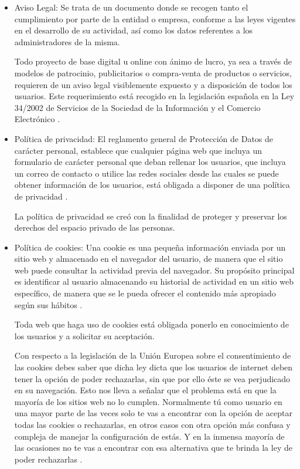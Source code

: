\documentclass[
  spanish,
  a4paper,
  openany]{book}
\begin{document}
\begin{itemize}
\item
  Aviso Legal: Se trata de un documento donde se recogen tanto el cumplimiento por parte de la entidad o empresa, conforme a las leyes vigentes en el desarrollo de su actividad, así como los datos referentes a los administradores de la misma.

  Todo proyecto de base digital u online con ánimo de lucro, ya sea a través de modelos de patrocinio, publicitarios o compra-venta de productos o servicios, requieren de un aviso legal visiblemente expuesto y a disposición de todos los usuarios. Este requerimiento está recogido en la legislación española en la Ley 34/2002 de Servicios de la Sociedad de la Información y el Comercio Electrónico \citep{IONOS-legal}.
\item
  Política de privacidad: El reglamento general de Protección de Datos de carácter personal, establece que cualquier página web que incluya un formulario de carácter personal que deban rellenar los usuarios, que incluya un correo de contacto o utilice las redes sociales desde las cuales se puede obtener información de los usuarios, está obligada a disponer de una política de privacidad \citep{IONOS-privacidad}.

  La política de privacidad se creó con la finalidad de proteger y preservar los derechos del espacio privado de las personas.
\item
  Política de cookies: Una cookie es una pequeña información enviada por un sitio web y almacenado en el navegador del usuario, de manera que el sitio web puede consultar la actividad previa del navegador. Su propósito principal es identificar al usuario almacenando su historial de actividad en un sitio web específico, de manera que se le pueda ofrecer el contenido más apropiado según sus hábitos \citep{IONOS-cookies}.

  Toda web que haga uso de cookies está obligada ponerlo en conocimiento de los usuarios y a solicitar su aceptación.

  Con respecto a la legislación de la Unión Europea sobre el consentimiento de las cookies debes saber que dicha ley dicta que los usuarios de internet deben tener la opción de poder rechazarlas, sin que por ello éste se vea perjudicado en su navegación. Esto nos lleva a señalar que el problema está en que la mayoría de los sitios web no lo cumplen. Normalmente tú como usuario en una mayor parte de las veces solo te vas a encontrar con la opción de aceptar todas las cookies o rechazarlas, en otros casos con otra opción más confusa y compleja de manejar la configuración de estás. Y en la inmensa mayoría de las ocasiones no te vas a encontrar con esa alternativa que te brinda la ley de poder rechazarlas \citep{GEN-rechazar-cookies}.
\end{itemize}
\end{document}
